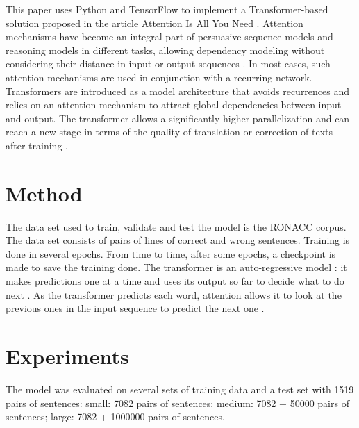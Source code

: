 \documentclass{article}
\begin{document}
        This paper uses Python and TensorFlow to implement a Transformer-based solution proposed in the article Attention Is All You Need \cite{vaswani2017attention}. Attention mechanisms have become an integral part of persuasive sequence models and reasoning models in different tasks, allowing dependency modeling without considering their distance in input or output sequences \cite{bahdanau2014neural}. In most cases, such attention mechanisms are used in conjunction with a recurring network. Transformers are introduced as a model architecture that avoids recurrences and relies on an attention mechanism to attract global dependencies between input and output. The transformer allows a significantly higher parallelization and can reach a new stage in terms of the quality of translation or correction of texts after training \cite{vaswani2017attention}.
        
    \section{Method}
        
        The data set used to train, validate and test the model is the RONACC corpus. The data set consists of pairs of lines of correct and wrong sentences. Training is done in several epochs. From time to time, after some epochs, a checkpoint is made to save the training done. The transformer is an auto-regressive model \cite{graves2013generating}: it makes predictions one at a time and uses its output so far to decide what to do next \cite{tensorflow2019transformer}. As the transformer predicts each word, attention allows it to look at the previous ones in the input sequence to predict the next one \cite{tensorflow2019transformer}.
        
    \section{Experiments}
        
        The model was evaluated on several sets of training data and a test set with 1519 pairs of sentences: small: 7082 pairs of sentences; medium: 7082 + 50000 pairs of sentences; large: 7082 + 1000000 pairs of sentences.
        
\end{document}
